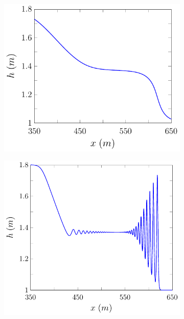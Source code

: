 \begin{figure}
	\centering
	\begin{subfigure}{0.5\textwidth}
		\includegraphics[width=\textwidth]{./chp2/figures/DamBreakStruct/1.pdf}
		\vspace{0.5cm}
	\end{subfigure}%
	\begin{subfigure}{0.5\textwidth}
		\includegraphics[width=\textwidth]{./chp2/figures/DamBreakStruct/6.pdf}

\end{subfigure}
\end{figure}
